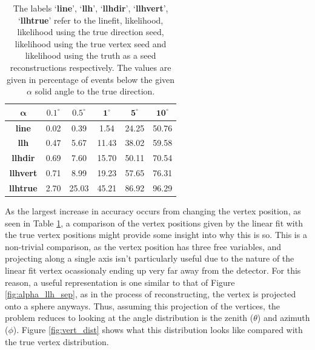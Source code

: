 \begin{table}[H]
  \centering
  \begin{tabular}{|c|c|c|c|c|c|} 
    \hline
    $\mathbf{\alpha}$ & $\mathbf{0.1^{\circ}}$ & $\mathbf{0.5^{\circ}}$ & $\mathbf{1^{\circ}}$ & $\mathbf{5^{\circ}}$ & $\mathbf{10^{\circ}}$ \\
    \hline
    \textbf{line} & 0.02 & 0.39 & 1.54 & 24.25 & 50.76 \\
    \hline
    \textbf{llh} & 0.47 & 5.67 & 11.43 & 38.02 & 59.58 \\
    \hline
    \textbf{llhdir} & 0.69 & 7.60 & 15.70 & 50.11 & 70.54 \\
    \hline
    \textbf{llhvert} & 0.71 & 8.99 & 19.23 & 57.65 & 76.31 \\
    \hline
    \textbf{llhtrue} & 2.70 & 25.03 & 45.21 & 86.92 & 96.29 \\
    \hline
  \end{tabular}
  \caption{The labels `\textbf{line}', `\textbf{llh}', `\textbf{llhdir}', `\textbf{llhvert}', `\textbf{llhtrue}' refer to the linefit, likelihood, likelihood using the true direction seed, likelihood using the true vertex seed and likelihood using the truth as a seed reconstructions respectively. The values are given in percentage of events below the given $\alpha$ solid angle to the true direction.} 
  \label{tab:alpha_comp}
\end{table}

As the largest increase in accuracy occurs from changing the vertex position, as seen in Table \ref{tab:alpha_comp}, a comparison of the vertex positions given by the linear fit with the true vertex positions might provide some insight into why this is so. This is a non-trivial comparison, as the vertex position has three free variables, and projecting along a single axis isn't particularly useful due to the nature of the linear fit vertex ocassionaly ending up very far away from the detector. For this reason, a useful representation is one similar to that of Figure \ref{fig:alpha_llh_sep}, as in the process of reconstructing, the vertex is projected onto a sphere anyways. Thus, assuming this projection of the vertices, the problem reduces to looking at the angle distribution is the zenith ($\theta$) and azimuth ($\phi$). Figure \ref{fig:vert_dist} shows what this distribution looks like compared with the true vertex distribution. 

